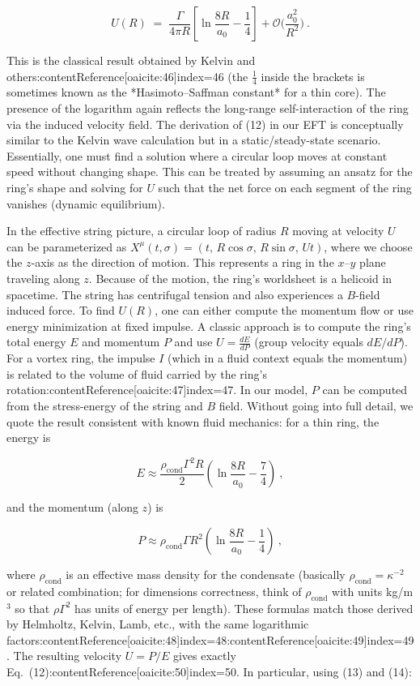 \documentclass[12pt]{article}
\begin{document}
\[ U(R) \;=\; \frac{\Gamma}{4\pi R}\left[\ln\!\frac{8R}{a_0} - \frac{1}{4}\right] + \mathcal{O}\!\Big(\frac{a_0^2}{R^2}\Big)~. \tag{12}\]

This is the classical result obtained by Kelvin and others:contentReference[oaicite:46]{index=46} (the $\frac{1}{4}$ inside the brackets is sometimes known as the *Hasimoto–Saffman constant* for a thin core). The presence of the logarithm again reflects the long-range self-interaction of the ring via the induced velocity field. The derivation of (12) in our EFT is conceptually similar to the Kelvin wave calculation but in a static/steady-state scenario. Essentially, one must find a solution where a circular loop moves at constant speed without changing shape. This can be treated by assuming an ansatz for the ring’s shape and solving for $U$ such that the net force on each segment of the ring vanishes (dynamic equilibrium).

In the effective string picture, a circular loop of radius $R$ moving at velocity $U$ can be parameterized as $X^\mu(t,\sigma) = (t,\, R\cos\sigma,\, R\sin\sigma,\, Ut)$, where we choose the $z$-axis as the direction of motion. This represents a ring in the $x$–$y$ plane traveling along $z$. Because of the motion, the ring’s worldsheet is a helicoid in spacetime. The string has centrifugal tension and also experiences a $B$-field induced force. To find $U(R)$, one can either compute the momentum flow or use energy minimization at fixed impulse. A classic approach is to compute the ring’s total energy $E$ and momentum $P$ and use $U = \frac{dE}{dP}$ (group velocity equals $dE/dP$). For a vortex ring, the impulse $I$ (which in a fluid context equals the momentum) is related to the volume of fluid carried by the ring’s rotation:contentReference[oaicite:47]{index=47}. In our model, $P$ can be computed from the stress-energy of the string and $B$ field. Without going into full detail, we quote the result consistent with known fluid mechanics: for a thin ring, the energy is 

\[ E \approx \frac{\rho_{\text{cond}} \Gamma^2 R}{2} \left(\ln\frac{8R}{a_0} - \frac{7}{4}\right) ~, \tag{13}\] 

and the momentum (along $z$) is 

\[ P \approx \rho_{\text{cond}} \Gamma R^2 \left(\ln\frac{8R}{a_0} - \frac{1}{4}\right) ~, \tag{14}\] 

where $\rho_{\text{cond}}$ is an effective mass density for the condensate (basically $\rho_{\text{cond}} = \kappa^{-2}$ or related combination; for dimensions correctness, think of $\rho_{\text{cond}}$ with units kg/m$^3$ so that $\rho \Gamma^2$ has units of energy per length). These formulas match those derived by Helmholtz, Kelvin, Lamb, etc., with the same logarithmic factors:contentReference[oaicite:48]{index=48}:contentReference[oaicite:49]{index=49}. The resulting velocity $U = P/E$ gives exactly Eq. (12):contentReference[oaicite:50]{index=50}. In particular, using (13) and (14): 
\end{document}

